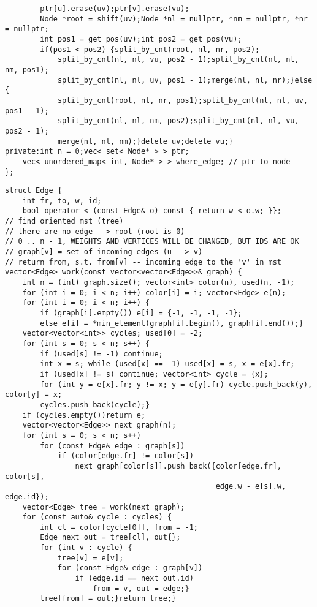 \documentclass[12pt]{article}
\begin{document}
\begin{verbatim}
        ptr[u].erase(uv);ptr[v].erase(vu);
        Node *root = shift(uv);Node *nl = nullptr, *nm = nullptr, *nr = nullptr;
        int pos1 = get_pos(uv);int pos2 = get_pos(vu);
        if(pos1 < pos2) {split_by_cnt(root, nl, nr, pos2);
            split_by_cnt(nl, nl, vu, pos2 - 1);split_by_cnt(nl, nl, nm, pos1);
            split_by_cnt(nl, nl, uv, pos1 - 1);merge(nl, nl, nr);}else {
            split_by_cnt(root, nl, nr, pos1);split_by_cnt(nl, nl, uv, pos1 - 1);
            split_by_cnt(nl, nl, nm, pos2);split_by_cnt(nl, nl, vu, pos2 - 1);
            merge(nl, nl, nm);}delete uv;delete vu;}
private:int n = 0;vec< set< Node* > > ptr;
    vec< unordered_map< int, Node* > > where_edge; // ptr to node
};
\end{verbatim}

\begin{verbatim}
struct Edge {
    int fr, to, w, id;
    bool operator < (const Edge& o) const { return w < o.w; }};
// find oriented mst (tree)
// there are no edge --> root (root is 0)
// 0 .. n - 1, WEIGHTS AND VERTICES WILL BE CHANGED, BUT IDS ARE OK
// graph[v] = set of incoming edges (u --> v)
// return from, s.t. from[v] -- incoming edge to the 'v' in mst
vector<Edge> work(const vector<vector<Edge>>& graph) {
    int n = (int) graph.size(); vector<int> color(n), used(n, -1);
    for (int i = 0; i < n; i++) color[i] = i; vector<Edge> e(n);
    for (int i = 0; i < n; i++) {
        if (graph[i].empty()) e[i] = {-1, -1, -1, -1};
        else e[i] = *min_element(graph[i].begin(), graph[i].end());}
    vector<vector<int>> cycles; used[0] = -2;
    for (int s = 0; s < n; s++) {
        if (used[s] != -1) continue;
        int x = s; while (used[x] == -1) used[x] = s, x = e[x].fr;
        if (used[x] != s) continue; vector<int> cycle = {x};
        for (int y = e[x].fr; y != x; y = e[y].fr) cycle.push_back(y), color[y] = x;
        cycles.push_back(cycle);}
    if (cycles.empty())return e;
    vector<vector<Edge>> next_graph(n);
    for (int s = 0; s < n; s++)
        for (const Edge& edge : graph[s])
            if (color[edge.fr] != color[s])
                next_graph[color[s]].push_back({color[edge.fr], color[s],
                                                edge.w - e[s].w, edge.id});
    vector<Edge> tree = work(next_graph);
    for (const auto& cycle : cycles) {
        int cl = color[cycle[0]], from = -1;
        Edge next_out = tree[cl], out{};
        for (int v : cycle) {
            tree[v] = e[v];
            for (const Edge& edge : graph[v])
                if (edge.id == next_out.id)
                    from = v, out = edge;}
        tree[from] = out;}return tree;}
\end{verbatim}
\end{document}
